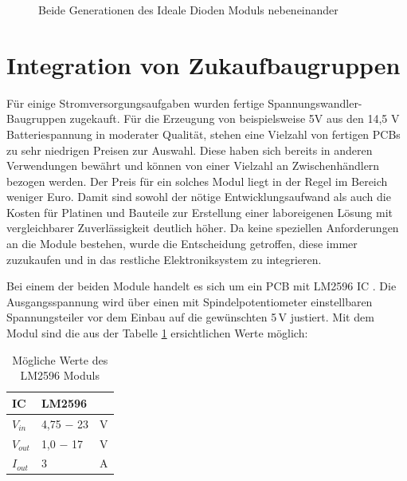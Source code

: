 \begin{figure}[H]
\centering
{}
\caption{Beide Generationen des Ideale Dioden Moduls nebeneinander} 
\label{fig:Beide Generationen des Ideale Dioden Moduls nebeneinander}
\end{figure}

\section{Integration von Zukaufbaugruppen}

Für einige Stromversorgungsaufgaben wurden fertige Spannungswandler-Baugruppen zugekauft. Für die Erzeugung von beispielsweise 5V aus den 14,5 V Batteriespannung in moderater Qualität, stehen eine Vielzahl von fertigen PCBs zu sehr niedrigen Preisen zur Auswahl. 
Diese haben sich bereits in anderen Verwendungen bewährt und können von einer Vielzahl an Zwischenhändlern bezogen werden. Der Preis für ein solches Modul liegt in der Regel im Bereich weniger Euro. Damit sind sowohl der nötige Entwicklungsaufwand als auch die Kosten für Platinen und Bauteile zur Erstellung einer laboreigenen Lösung mit vergleichbarer Zuverlässigkeit deutlich höher. Da keine speziellen Anforderungen an die Module bestehen, wurde die Entscheidung getroffen, diese immer zuzukaufen und in das restliche Elektroniksystem zu integrieren.

Bei einem der beiden Module handelt es sich um ein PCB mit LM2596 IC . 
Die Ausgangsspannung wird über einen mit Spindelpotentiometer einstellbaren Spannungsteiler vor dem Einbau auf die gewünschten 5\,V justiert.
Mit dem Modul sind die aus der Tabelle \ref{Mögliche Werte des LM2596 Moduls} ersichtlichen Werte möglich:

\begin{table}[h]
\centering
\begin{tabular}{|l|l|l|}
\hline
IC    & LM2596    &   \\ \hline
$V_{in}$  & 4,75 $-$ 23 & V \\ \hline
$V_{out}$ & 1,0 $-$ 17  & V \\ \hline
$I_{out}$ & 3         & A \\ \hline
\end{tabular}
\caption{Mögliche Werte des LM2596 Moduls}
\label{Mögliche Werte des LM2596 Moduls}
\end{table}

